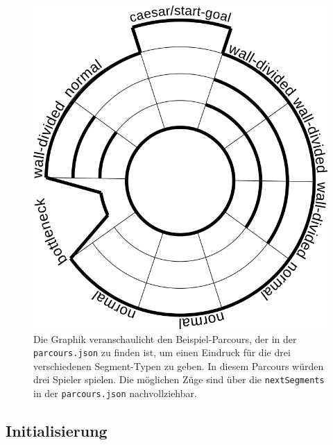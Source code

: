 \documentclass[]{article}
\begin{document}
\begin{figure}
    \caption{Die Graphik veranschaulicht den Beispiel-Parcours, der in der \texttt{parcours.json} zu finden ist, um einen Eindruck für die drei verschiedenen Segment-Typen zu geben. In diesem Parcours würden drei Spieler spielen. Die möglichen Züge sind über die \texttt{nextSegments} in der \texttt{parcours.json} nachvollziehbar.}
    \label{fig:parcours}
    \includegraphics[width=\textwidth]{parcours.png}
\end{figure}

\subsection{Initialisierung}
\label{subsec:initialisierung}
\end{document}
